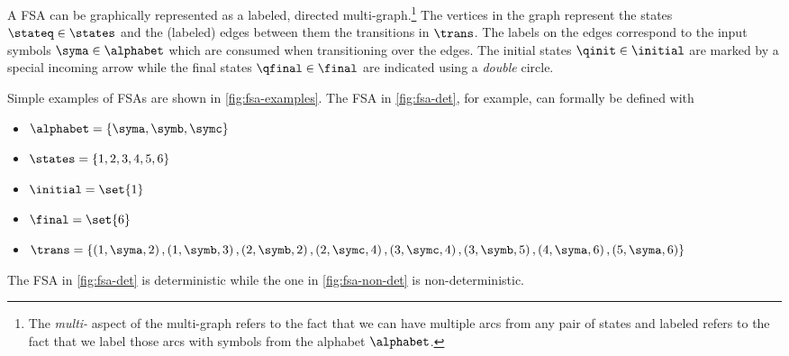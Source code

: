 A FSA can be graphically represented as a labeled, directed multi-graph.\footnote{The \emph{multi-} aspect of the multi-graph refers to the fact that we can have multiple arcs from any pair of states and labeled refers to the fact that we label those arcs with symbols from the alphabet $\alphabet$.} 
The vertices in the graph represent the states $\stateq \in \states$ and the (labeled) edges between them the transitions in $\trans$. 
The labels on the edges correspond to the input symbols $\syma \in \alphabet$ which are consumed when transitioning over the edges.
The initial states $\qinit \in \initial$ are marked by a special incoming arrow while the final states $\qfinal \in \final$ are indicated using a \emph{double} circle.

\begin{example}
Simple examples of FSAs are shown in \cref{fig:fsa-examples}. The FSA in \cref{fig:fsa-det}, for example, can formally be defined with 
\begin{itemize}
    \item $\alphabet = \left\{\syma, \symb, \symc \right\}$
    \item $\states = \left\{1, 2, 3, 4, 5, 6 \right\}$
    \item $\initial = \set{1}$
    \item $\final = \set{6}$
    \item $\trans = \{\left(1, \syma, 2\right), \left(1, \symb, 3\right), \left(2, \symb, 2\right),\allowbreak \left(2, \symc, 4\right), \left(3, \symc, 4\right), \left(3, \symb, 5\right), \left(4, \syma, 6\right), \left(5, \syma, 6\right)\}$
\end{itemize}
The FSA in \cref{fig:fsa-det} is deterministic while the one in \cref{fig:fsa-non-det} is non-deterministic.
\begin{figure}[ht!] 
\centering
\begin{subfigure}[\tstep]{0.45\textwidth}
    \centering
\end{subfigure}
\end{figure}
\end{example}
